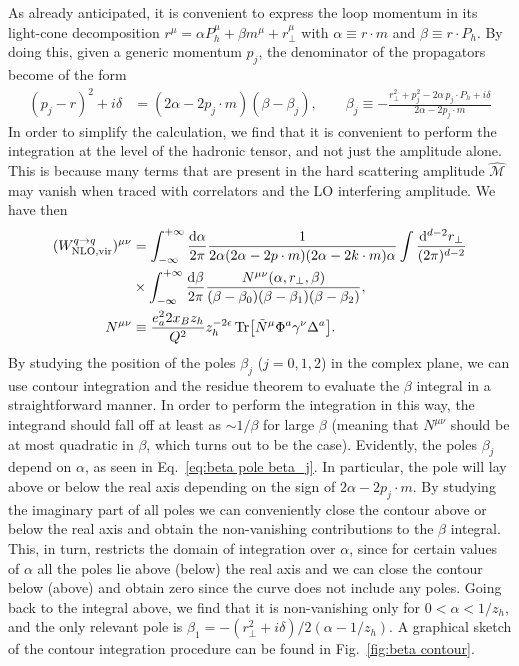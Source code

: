 As already anticipated, it is convenient to express the loop momentum in its light-cone decomposition $r^\mu = \alpha P_h^\mu+\beta m^\mu+r_\perp^\mu$ with $\alpha\equiv r\cdot m$ and $\beta\equiv r\cdot P_h$. By doing this, given a generic momentum $p_j$, the denominator of the propagators become of the form
\begin{equation}\label{eq:beta pole beta_j}
\begin{aligned}
        (p_j-r)^2+i\delta&=(2\alpha-2p_j \cdot m)(\beta - \beta_j),\qquad \beta_j\equiv -\frac{r_\perp^2+p_j^2-2\alpha \,p_j\cdot P_h+i\delta}{2\alpha-2p_j\cdot m}
\end{aligned}
\end{equation}
In order to simplify the calculation, we find that it is convenient to perform the integration at the level of the hadronic tensor, and not just the amplitude alone. This is because many terms that are present in the hard scattering amplitude $\hat{\mathcal{M}}$ may vanish when traced with correlators and the LO interfering amplitude. We have then
\begin{equation}
\begin{aligned}
       (W^{q \to q}_{\text{NLO,vir}})^{\mu\nu} &=\int_{-\infty}^{+\infty}\frac{\dd \alpha}{2\pi} \frac{1}{2\alpha(2\alpha-2p \cdot m)(2\alpha-2 k \cdot m)\alpha}\int \frac{\dd^{d-2}r_\perp}{(2\pi)^{d-2}}\\
       &\times\int_{-\infty}^{+\infty}\frac{\dd \beta}{2\pi}\frac{N^{\mu\nu}(\alpha,r_\perp,\beta)}{(\beta-\beta_0)(\beta-\beta_1)(\beta-\beta_2)},\\
        N^{\mu\nu}&\equiv \frac{e_a^2 2x_B z_h }{Q^2}z_h^{-2\epsilon}\Tr[\tilde N^\mu\Phi^a\gamma^\nu \Delta^a].
\end{aligned}
\end{equation}
By studying the position of the poles $\beta_j$ ($j=0,1,2$) in the complex plane, we can use contour integration and the residue theorem to evaluate the $\beta$ integral in a straightforward manner. In order to perform the integration in this way, the integrand should fall off at least as $\sim1/\beta$ for large $\beta$ (meaning that $N^{\mu\nu}$ should be at most quadratic in $\beta$, which turns out to be the case). Evidently, the poles $\beta_j$ depend on $\alpha$, as seen in Eq.~\eqref{eq:beta pole beta_j}. In particular, the pole will lay above or below the real axis depending on the sign of $2\alpha-2p_j\cdot m$. By studying the imaginary part of all poles we can conveniently close the contour above or below the real axis and obtain the non-vanishing contributions to the $\beta$ integral. This, in turn, restricts the domain of integration over $\alpha$, since for certain values of $\alpha$ all the poles lie above (below) the real axis and we can close the contour below (above) and obtain zero since the curve does not include any poles. Going back to the integral above, we find that it is non-vanishing only for $0<\alpha<1/z_h$, and the only relevant pole is $\beta_1 = -(r_\perp^2+i\delta)/2(\alpha-1/z_h)$. A graphical sketch of the contour integration procedure can be found in Fig.~\ref{fig:beta contour}.

